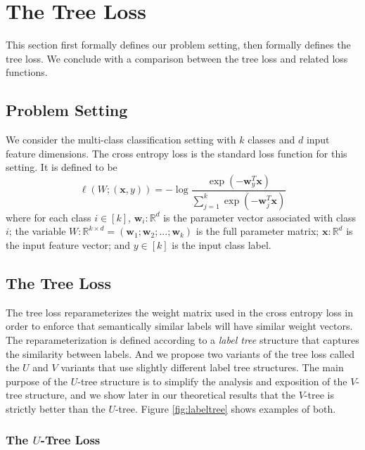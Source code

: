 \documentclass[twoside]{article}
\newcommand{\R}{\mathbb R}
\newcommand{\trans}[1]{{#1}^{T}}
\newcommand{\w}{\mathbf w}
\newcommand{\x}{\mathbf x}
\begin{document}
\section{The Tree Loss}

This section first formally defines our problem setting,
then formally defines the tree loss.
We conclude with a comparison between the tree loss and related loss functions.

\subsection{Problem Setting}

We consider the multi-class classification setting with $k$ classes and $d$ input feature dimensions.
The cross entropy loss is the standard loss function for this setting.
It is defined to be
\begin{equation}
    \label{eq:xentropy}
    \ell(W;(\x,y)) = - \log \frac {\exp(-\trans\w_y \x)}{\sum_{j=1}^k \exp(-\trans \w_j \x)}
\end{equation}
where for each class $i\in[k]$,
$\w_i : \R^d$ is the parameter vector associated with class $i$;
the variable $W : \R^{k \times d} = (\w_1; \w_2; ...; \w_k)$ is the full parameter matrix;
$\x : \R^d$ is the input feature vector;
and $y \in [k]$ is the input class label.

\subsection{The Tree Loss}

The tree loss reparameterizes the weight matrix used in the cross entropy loss in order to enforce that semantically similar labels will have similar weight vectors.
The reparameterization is defined according to a \emph{label tree} structure that captures the similarity between labels.
And we propose two variants of the tree loss called the $U$ and $V$ variants that use slightly different label tree structures.
The main purpose of the $U$-tree structure is to simplify the analysis and exposition of the $V$-tree structure,
and we show later in our theoretical results that the $V$-tree is strictly better than the $U$-tree.
Figure \ref{fig:labeltree} shows examples of both.

\subsubsection{The $U$-Tree Loss}
\end{document}
